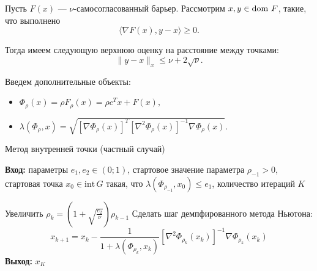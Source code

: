 \begin{theorem}
    Пусть $F(x)$ --- $\nu$-самосогласованный барьер. Рассмотрим $x, y \in \operatorname{dom \,} F$, такие, что выполнено
    $$\langle \nabla F(x), y - x \rangle \geq 0.$$

    Тогда имеем следующую верхнюю оценку на расстояние между точками:
    $$\|y - x\|_x \leq \nu + 2\sqrt{\nu}.$$
\end{theorem}

Введем дополнительные объекты:
\begin{itemize}
    \item $\Phi_\rho(x) = \rho F_\rho(x) = \rho c^T x + F(x),$
    \item $\lambda(\Phi_\rho, x) = \sqrt{\left[\nabla \Phi_\rho(x)\right]^T \left[\nabla^2 \Phi_\rho(x)\right]^{-1} \nabla \Phi_\rho(x)}.$
\end{itemize}

\begin{algorithm}[H]
    \caption{Метод внутренней точки (частный случай)}
    \textbf{Вход:} параметры $e_1, e_2 \in (0; 1)$, стартовое значение параметра $\rho_{-1} > 0$, стартовая точка $x_0 \in \mathrm{int}\,G$ такая, что $\lambda(\Phi_{\rho_{-1}}, x_0) \leq e_1$, количество итераций $K$
    \begin{algorithmic}[1]
        \State Увеличить $\rho_k = \left(1 + \sqrt{\frac{e_2}{\nu}}\right) \rho_{k-1}$
        \State Сделать шаг демпфированного метода Ньютона:
        \[
            x_{k+1} = x_k - \frac{1}{1 + \lambda(\Phi_{\rho_k}, x_k)} \left[\nabla^2 \Phi_{\rho_k}(x_k)\right]^{-1} \nabla \Phi_{\rho_k}(x_k)
        \]
        \EndFor
        \State \textbf{Выход:} $x_K$
    \end{algorithmic}
\end{algorithm}
